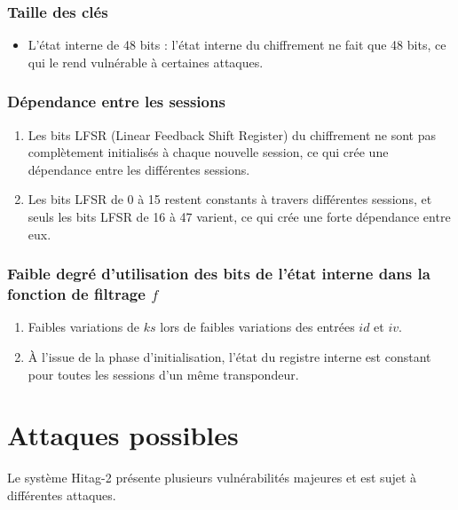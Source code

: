 \documentclass{template}
\begin{document}
\subsubsection{Taille des clés}

\begin{itemize}
    \item L'état interne de 48 bits : l'état interne du chiffrement ne fait que 48 bits, ce qui le rend vulnérable à certaines attaques.
\end{itemize}

\subsubsection{Dépendance entre les sessions}

\begin{enumerate}
    \item Les bits LFSR (Linear Feedback Shift Register) du chiffrement ne sont pas complètement initialisés à chaque nouvelle session, ce qui crée une dépendance entre les différentes sessions.
    \item Les bits LFSR de 0 à 15 restent constants à travers différentes sessions, et seuls les bits LFSR de 16 à 47 varient, ce qui crée une forte dépendance entre eux.
\end{enumerate}

\subsubsection{Faible degré d'utilisation des bits de l'état interne dans la fonction de filtrage \(f\)}

\begin{enumerate}
    \item Faibles variations de \(ks\) lors de faibles variations des entrées \(id\) et \(iv\).
    \item À l'issue de la phase d'initialisation, l'état du registre interne est constant pour toutes les sessions d'un même transpondeur.
\end{enumerate}

\section{Attaques possibles}

Le système Hitag-2 présente plusieurs vulnérabilités majeures et est sujet à différentes attaques.
\end{document}
